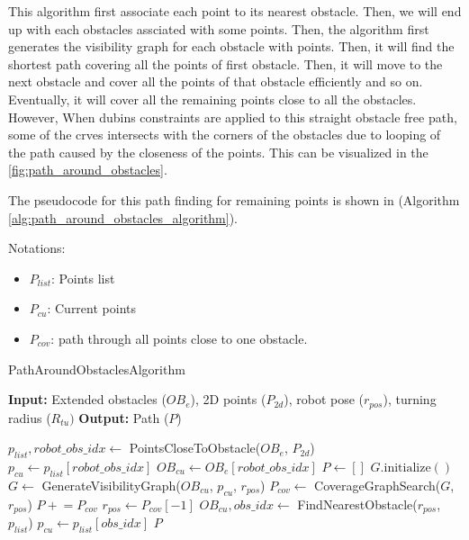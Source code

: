 \vspace{3mm}  

This algorithm first associate each point to its nearest obstacle. Then, we will end up with each obstacles assciated with some points. Then, the algorithm first generates the visibility graph for each obstacle with points. Then, it will find the shortest path covering all the points of first obstacle. Then, it will move to the next obstacle and cover all the points of that obstacle efficiently and so on. Eventually, it will cover all the remaining points close to all the obstacles. However, When dubins constraints are applied to this straight obstacle free path, some of the crves intersects with the corners of the obstacles due to looping of the path caused by the closeness of the points. This can be visualized in the \autoref{fig:path_around_obstacles}.


\vspace{3mm}  

The pseudocode for this path finding for remaining points is shown in (Algorithm \autoref{alg:path_around_obstacles_algorithm}). 



Notations:
\begin{itemize}[noitemsep,topsep=0pt]
    \item $P_{list}$: Points list
    \item $P_{cu}$: Current points
    \item $P_{cov}$: path through all points close to one obstacle.  
\end{itemize}

\begin{algorithm}[H]     
    \caption{PathAroundObstaclesAlgorithm}  
    \label{alg:path_around_obstacles_algorithm}
    \begin{algorithmic}[1]
    \Statex \textbf{Input:} Extended obstacles ($OB_e$), 2D points ($P_{2d}$), robot pose ($r_{pos}$), turning radius ($R_{tu}) $
    \Statex \textbf{Output:} Path ($P$)
    \newline
    
    \State $p_{list}, robot\_obs\_idx \leftarrow$ PointsCloseToObstacle($OB_e$, $P_{2d}$)
    \State $p_{cu} \leftarrow p_{list}[robot\_obs\_idx]$    
    \State $OB_{cu} \leftarrow OB_e[robot\_obs\_idx]$
    \State $P \leftarrow []$
        \State $G.\text{initialize}()$
        \State $G \leftarrow$ GenerateVisibilityGraph($OB_{cu}$, $p_{cu}$, $r_{pos}$)
        \State $P_{cov} \leftarrow$ CoverageGraphSearch($G$, $r_{pos}$)
        \State $P \mathrel{+}= P_{cov}$
        \State $r_{pos} \leftarrow P_{cov}[-1]$
        \State $OB_{cu}, obs\_idx \leftarrow$ FindNearestObstacle($r_{pos}$, $p_{list}$)
        \State $p_{cu} \leftarrow p_{list}[obs\_idx]$
    \EndFor
    \State \Return $P$
    \end{algorithmic}
    \end{algorithm}


